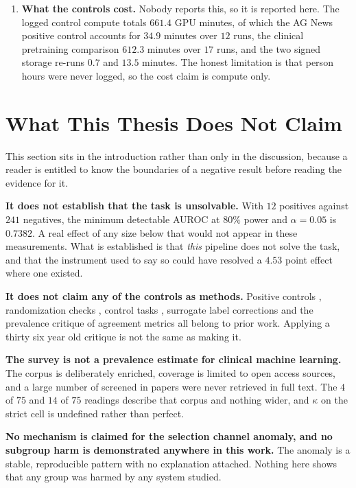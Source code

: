 \begin{enumerate}
\item \textbf{What the controls cost.} Nobody reports this, so it is reported
here. The logged control compute totals $661.4$ GPU minutes, of which the AG
News positive control accounts for $34.9$ minutes over $12$ runs, the clinical
pretraining comparison $612.3$ minutes over $17$ runs, and the two signed
storage re-runs $0.7$ and $13.5$ minutes. The honest limitation is that person
hours were never logged, so the cost claim is compute only.

\end{enumerate}

\section{What This Thesis Does Not Claim}
\label{sec:intro-notclaim}

This section sits in the introduction rather than only in the discussion,
because a reader is entitled to know the boundaries of a negative result before
reading the evidence for it.

\textbf{It does not establish that the task is unsolvable.} With $12$ positives
against $241$ negatives, the minimum detectable AUROC at $80\%$ power and
$\alpha = 0.05$ is $0.7382$. A real effect of any size below that would not
appear in these measurements. What is established is that \emph{this} pipeline
does not solve the task, and that the instrument used to say so could have
resolved a $4.53$ point effect where one existed.

\textbf{It does not claim any of the controls as methods.} Positive controls
\citep{lipsitch2010negative}, randomization checks \citep{adebayo2018sanity},
control tasks \citep{hewitt2019control}, surrogate label corrections
\citep{egami2023surrogates} and the prevalence critique of agreement metrics
\citep{feinstein1990paradoxes} all belong to prior work. Applying a thirty six
year old critique is not the same as making it.

\textbf{The survey is not a prevalence estimate for clinical machine learning.}
The corpus is deliberately enriched, coverage is limited to open access sources,
and a large number of screened in papers were never retrieved in full text. The
$4$ of $75$ and $14$ of $75$ readings describe that corpus and nothing wider,
and $\kappa$ on the strict cell is undefined rather than perfect.

\textbf{No mechanism is claimed for the selection channel anomaly, and no
subgroup harm is demonstrated anywhere in this work.} The anomaly is a stable,
reproducible pattern with no explanation attached. Nothing here shows that any
group was harmed by any system studied.

